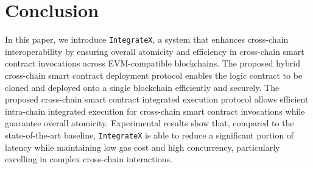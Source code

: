 \section{Conclusion}


In this paper, we introduce \texttt{IntegrateX}, a system that enhances cross-chain interoperability by ensuring overall atomicity and efficiency in cross-chain smart contract invocations across EVM-compatible blockchains. 
The proposed hybrid cross-chain smart contract deployment protocol enables the logic contract to be cloned and deployed onto a single blockchain efficiently and securely.
The proposed cross-chain smart contract integrated execution protocol allows efficient intra-chain integrated execution for cross-chain smart contract invocations while guarantee overall atomicity. 
Experimental results show that, compared to the state-of-the-art baseline, \texttt{IntegrateX} is able to reduce a significant portion of latency while maintaining low gas cost and high concurrency, particularly excelling in complex cross-chain interactions. 
